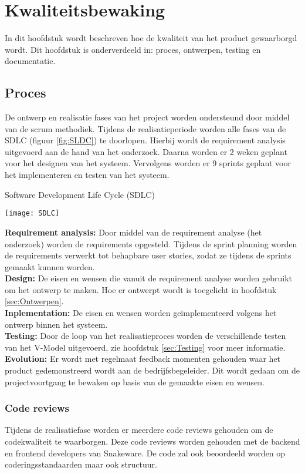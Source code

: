 \chapter{Kwaliteitsbewaking}
In dit hoofdstuk wordt beschreven hoe de kwaliteit van het product gewaarborgd wordt.
Dit hoofdstuk is onderverdeeld in: proces, ontwerpen, testing en documentatie.
\section{Proces}
De ontwerp en realisatie fases van het project worden ondersteund door middel van de scrum methodiek.
\whitespace
Tijdens de realisatieperiode worden alle fases van de SDLC (figuur \ref{fig:SLDC}) te doorlopen.
Hierbij wordt de requirement analysis uitgevoerd aan de hand van het onderzoek.
Daarna worden er 2 weken geplant voor het designen van het systeem.
Vervolgens worden er 9 sprints geplant voor het implementeren en testen van het systeem. \\
\begin{graphic}
    \captionsetup{type=figure}
    \caption{Software Development Life Cycle (SDLC)}
    \texttt{[image: SDLC]}
    \label{fig:SLDC}
\end{graphic}
\textbf{Requirement analysis:} Door middel van de requirement analyse (het onderzoek) worden de requirements opgesteld.
Tijdens de sprint planning worden de requirements verwerkt tot behapbare user stories, zodat ze tijdens de sprints gemaakt kunnen worden. \\
\textbf{Design:} De eisen en wensen die vanuit de requirement analyse worden gebruikt om het ontwerp te maken.
Hoe er ontwerpt wordt is toegelicht in hoofdstuk \ref{sec:Ontwerpen}.\\
\textbf{Inplementation:}
De eisen en wensen worden geïmplementeerd volgens het ontwerp binnen het systeem.\\
\textbf{Testing:} Door de loop van het realisatieproces worden de verschillende testen van het V-Model uitgevoerd, zie hoofdstuk \ref{sec:Testing} voor meer informatie.\\
\textbf{Evolution:} Er wordt met regelmaat feedback momenten gehouden waar het product gedemonstreerd wordt aan de bedrijfsbegeleider.
Dit wordt gedaan om de projectvoortgang te bewaken op basis van de gemaakte eisen en wensen.
\subsection{Code reviews}
Tijdens de realisatiefase worden er meerdere code reviews gehouden om de codekwaliteit te waarborgen.
Deze code reviews worden gehouden met de backend en frontend developers van Snakeware.
De code zal ook beoordeeld worden op coderingsstandaarden maar ook structuur.

